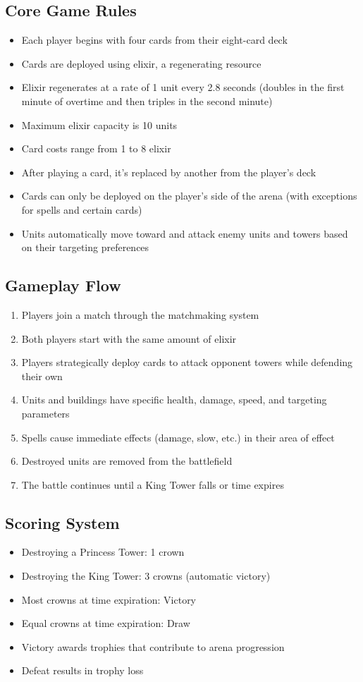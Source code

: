 \documentclass{article}
\begin{document}
\subsection{Core Game Rules}
\begin{itemize}
    \item Each player begins with four cards from their eight-card deck
    \item Cards are deployed using elixir, a regenerating resource
    \item Elixir regenerates at a rate of 1 unit every 2.8 seconds (doubles in the first minute of overtime and then triples in the second minute)
    \item Maximum elixir capacity is 10 units
    \item Card costs range from 1 to 8 elixir
    \item After playing a card, it's replaced by another from the player's deck
    \item Cards can only be deployed on the player's side of the arena (with exceptions for spells and certain cards)
    \item Units automatically move toward and attack enemy units and towers based on their targeting preferences
\end{itemize}

\subsection{Gameplay Flow}
\begin{enumerate}
    \item Players join a match through the matchmaking system
    \item Both players start with the same amount of elixir
    \item Players strategically deploy cards to attack opponent towers while defending their own
    \item Units and buildings have specific health, damage, speed, and targeting parameters
    \item Spells cause immediate effects (damage, slow, etc.) in their area of effect
    \item Destroyed units are removed from the battlefield
    \item The battle continues until a King Tower falls or time expires
\end{enumerate}

\subsection{Scoring System}
\begin{itemize}
    \item Destroying a Princess Tower: 1 crown
    \item Destroying the King Tower: 3 crowns (automatic victory)
    \item Most crowns at time expiration: Victory
    \item Equal crowns at time expiration: Draw
    \item Victory awards trophies that contribute to arena progression
    \item Defeat results in trophy loss
\end{itemize}
\end{document}
